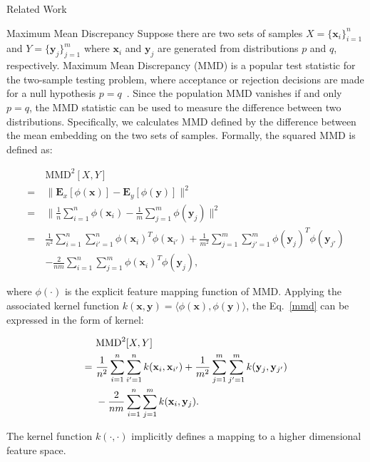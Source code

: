 \documentclass{article}
\begin{document}
\begin{section}{Related Work}
\begin{paragraph}{Maximum Mean Discrepancy} Suppose there are two sets of samples $X=\{\mathbf{x}_i\}_{i=1}^{n}$ and $Y = \{\mathbf{y}_j\}_{j=1}^{m}$ where $\mathbf{x}_i$ and $\mathbf{y}_j$ are generated from distributions $p$ and $q$, respectively. Maximum Mean Discrepancy (MMD) is a popular test statistic for the two-sample testing problem, where acceptance or rejection decisions are made for a null hypothesis $p = q$~\cite{mmd}. Since the population MMD vanishes if and only $p = q$, the MMD statistic can be used to measure the difference between two distributions. Specifically, we calculates MMD defined by the difference between the mean embedding on the two sets of samples. Formally, the squared MMD is defined as:
\begin{small}
\begin{equation}\label{mmd}
\begin{aligned}
&  \text{MMD}^2[X, Y]\\
		 = ~ &\| \mathbf{E}_x[\phi(\mathbf{x})] - \mathbf{E}_y[\phi(\mathbf{y})] \|^2\\
		= ~&\| \frac{1}{n}\sum_{i=1}^{n}\phi(\mathbf{x}_i) - \frac{1}{m}\sum_{j=1}^{m}\phi(\mathbf{y}_j) \|^2\\
		= ~&\frac{1}{n^2}\sum_{i=1}^{n}\sum_{i'=1}^{n}\phi(\mathbf{x}_i)^T\phi(\mathbf{x}_{i'}) + 
		   \frac{1}{m^2}\sum_{j=1}^{m}\sum_{j'=1}^{m}\phi(\mathbf{y}_j)^T\phi(\mathbf{y}_{j'}) \\
		&   -\frac{2}{nm}\sum_{i=1}^{n}\sum_{j=1}^{m}\phi(\mathbf{x}_i)^T\phi(\mathbf{y}_{j}),
\end{aligned}
\end{equation}
\end{small}
where $\phi(\cdot)$ is the explicit feature mapping function of MMD. Applying the associated kernel function $k(\mathbf{x}, \mathbf{y}) = \langle\phi(\mathbf{x}), \phi(\mathbf{y})\rangle$, the Eq.~\ref{mmd} can be expressed in the form of kernel:
\begin{small}
\begin{equation}{\label{mmd_kernel}}
\begin{aligned}
&\text{MMD}^2[X, Y]\\
	= ~ & \frac{1}{n^2}\sum_{i=1}^{n}\sum_{i'=1}^{n}k(\mathbf{x}_i, \mathbf{x}_{i'}) + 
		   \frac{1}{m^2}\sum_{j=1}^{m}\sum_{j'=1}^{m}k(\mathbf{y}_j, \mathbf{y}_{j'}) \\
	&	   -\frac{2}{nm}\sum_{i=1}^{n}\sum_{j=1}^{m}k(\mathbf{x}_i, \mathbf{y}_j).
\end{aligned}
\end{equation}
\end{small}
The kernel function $k(\cdot, \cdot)$ implicitly defines a mapping to a higher dimensional feature space.
\end{paragraph}

\end{section}
\end{document}
